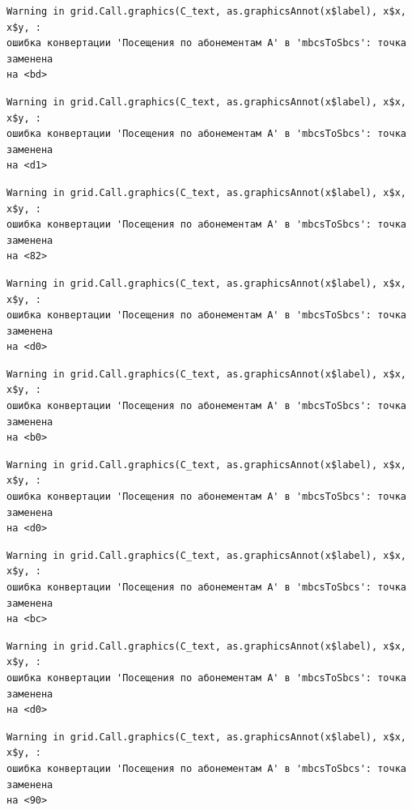 \documentclass[
  letterpaper,
  DIV=11,
  numbers=noendperiod]{scrreprt}
\begin{document}
\begin{verbatim}
Warning in grid.Call.graphics(C_text, as.graphicsAnnot(x$label), x$x, x$y, :
ошибка конвертации 'Посещения по абонементам А' в 'mbcsToSbcs': точка заменена
на <bd>
\end{verbatim}

\begin{verbatim}
Warning in grid.Call.graphics(C_text, as.graphicsAnnot(x$label), x$x, x$y, :
ошибка конвертации 'Посещения по абонементам А' в 'mbcsToSbcs': точка заменена
на <d1>
\end{verbatim}

\begin{verbatim}
Warning in grid.Call.graphics(C_text, as.graphicsAnnot(x$label), x$x, x$y, :
ошибка конвертации 'Посещения по абонементам А' в 'mbcsToSbcs': точка заменена
на <82>
\end{verbatim}

\begin{verbatim}
Warning in grid.Call.graphics(C_text, as.graphicsAnnot(x$label), x$x, x$y, :
ошибка конвертации 'Посещения по абонементам А' в 'mbcsToSbcs': точка заменена
на <d0>
\end{verbatim}

\begin{verbatim}
Warning in grid.Call.graphics(C_text, as.graphicsAnnot(x$label), x$x, x$y, :
ошибка конвертации 'Посещения по абонементам А' в 'mbcsToSbcs': точка заменена
на <b0>
\end{verbatim}

\begin{verbatim}
Warning in grid.Call.graphics(C_text, as.graphicsAnnot(x$label), x$x, x$y, :
ошибка конвертации 'Посещения по абонементам А' в 'mbcsToSbcs': точка заменена
на <d0>
\end{verbatim}

\begin{verbatim}
Warning in grid.Call.graphics(C_text, as.graphicsAnnot(x$label), x$x, x$y, :
ошибка конвертации 'Посещения по абонементам А' в 'mbcsToSbcs': точка заменена
на <bc>
\end{verbatim}

\begin{verbatim}
Warning in grid.Call.graphics(C_text, as.graphicsAnnot(x$label), x$x, x$y, :
ошибка конвертации 'Посещения по абонементам А' в 'mbcsToSbcs': точка заменена
на <d0>
\end{verbatim}

\begin{verbatim}
Warning in grid.Call.graphics(C_text, as.graphicsAnnot(x$label), x$x, x$y, :
ошибка конвертации 'Посещения по абонементам А' в 'mbcsToSbcs': точка заменена
на <90>
\end{verbatim}
\end{document}
